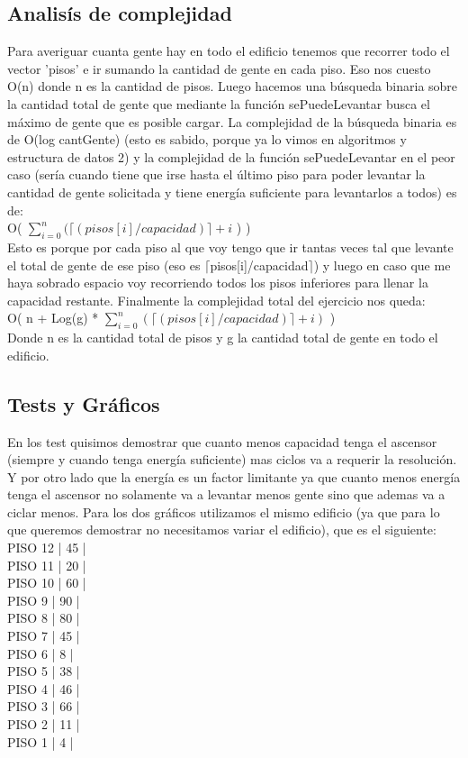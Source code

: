 \subsection{Analisís de complejidad}	
Para averiguar cuanta gente hay en todo el edificio tenemos que recorrer todo el vector 'pisos' e ir sumando la cantidad de gente en cada piso. Eso nos cuesto O(n) donde n es la cantidad de pisos. Luego hacemos una búsqueda binaria sobre la cantidad total de gente que mediante la función sePuedeLevantar busca el máximo de gente que es posible cargar. La complejidad de la búsqueda binaria es de O(log cantGente) (esto es sabido, porque ya lo vimos en algoritmos y estructura de datos 2) y la complejidad de la función sePuedeLevantar en el peor caso (sería cuando tiene que irse hasta el último piso para poder levantar la cantidad de gente solicitada y tiene energía suficiente para levantarlos a todos) es de: \\
	O( $\sum\limits_{i=0}^{n} { ( \lceil (pisos[i]/capacidad) \rceil  + i}$ ) ) \\
Esto es porque por cada piso al que voy tengo que ir tantas veces tal que levante el total de gente de ese piso (eso es $\lceil$pisos[i]/capacidad$\rceil$) y luego en caso que me haya sobrado espacio voy recorriendo todos los pisos inferiores para llenar la capacidad restante.
Finalmente la complejidad total del ejercicio nos queda:\\
O( n + Log(g) * $\sum\limits_{i=0}^{n} { ( \lceil (pisos[i]/capacidad) \rceil  + i ) }$ ) \\
Donde n es la cantidad total de pisos y g la cantidad total de gente en todo el edificio.

\subsection{Tests y Gráficos}
En los test quisimos demostrar que cuanto menos capacidad tenga el ascensor (siempre y cuando tenga energía suficiente) mas ciclos va a requerir la resolución. Y por otro lado que la energía es un factor limitante ya que cuanto menos energía tenga el ascensor no solamente va a levantar menos gente sino que ademas va a ciclar menos.
Para los dos gráficos utilizamos el mismo edificio (ya que para lo que queremos demostrar no necesitamos variar el edificio), que es el siguiente: \\

PISO 12 | 45 | \\
PISO 11 | 20 | \\
PISO 10 | 60 | \\
PISO 9  | 90 | \\
PISO 8  | 80 | \\
PISO 7  | 45 | \\
PISO 6  | 8  | \\
PISO 5  | 38 | \\
PISO 4  | 46 | \\
PISO 3  | 66 | \\
PISO 2  | 11 | \\
PISO 1  | 4  | \\

